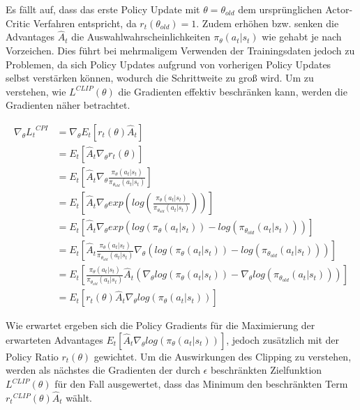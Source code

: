 Es fällt auf, dass das erste Policy Update mit $\theta = \theta_{old}$ dem ursprünglichen
Actor-Critic Verfahren entspricht, da $r_t(\theta_{old}) = 1$. Zudem erhöhen bzw. senken
die Advantages $\hat{A}_t$ die Auswahlwahrscheinlichkeiten $\pi_\theta(a_t | s_t)$
wie gehabt je nach Vorzeichen. Dies führt bei mehrmaligem Verwenden der Trainingsdaten
jedoch zu Problemen, da sich Policy Updates aufgrund von vorherigen Policy Updates
selbst verstärken können, wodurch die Schrittweite zu groß wird. Um zu verstehen,
wie $L^{CLIP}(\theta)$ die Gradienten effektiv beschränken kann, werden die Gradienten
näher betrachtet.

\begin{equation}
\begin{aligned}
\nabla_\theta {L_t}^{CPI}
&= \nabla_\theta E_t\left[r_t(\theta) \hat{A}_t\right]\\
&= E_t\left[\hat{A}_t \nabla_\theta r_t(\theta)\right]\\
&= E_t\left[\hat{A}_t \nabla_\theta
    \frac{\pi_\theta(a_t | s_t)}{\pi_{\theta_{old}}(a_t | s_t)}\right]\\
&= E_t\left[\hat{A}_t \nabla_\theta exp\left(log\left(\frac{\pi_\theta(a_t | s_t)}
    {\pi_{\theta_{old}}(a_t | s_t)}\right)\right)\right]\\
&= E_t\left[\hat{A}_t \nabla_\theta
    exp(log(\pi_\theta(a_t | s_t)) - log(\pi_{\theta_{old}}(a_t | s_t)))\right]
        \label{eq:ppograds}\\
&= E_t\left[\hat{A}_t \frac{\pi_\theta(a_t | s_t)}{\pi_{\theta_{old}}(a_t | s_t)}
    \nabla_\theta (log(\pi_\theta(a_t | s_t)) - log(\pi_{\theta_{old}}(a_t | s_t)))\right]\\
&= E_t\left[\frac{\pi_\theta(a_t | s_t)}{\pi_{\theta_{old}}(a_t | s_t)} \hat{A}_t
    (\nabla_\theta log(\pi_\theta(a_t | s_t))
        - \nabla_\theta log(\pi_{\theta_{old}}(a_t | s_t)))\right]\\
&= E_t\left[r_t(\theta) \hat{A}_t \nabla_\theta log(\pi_\theta(a_t | s_t))\right]
\end{aligned}
\end{equation}

Wie erwartet ergeben sich die Policy Gradients für die Maximierung der erwarteten
Advantages $E_t[\hat{A}_t\nabla_\theta log(\pi_\theta(a_t | s_t))]$, jedoch zusätzlich mit
der Policy Ratio $r_t(\theta)$ gewichtet. Um die Auswirkungen des Clipping zu verstehen,
werden als nächstes die Gradienten der durch $\epsilon$ beschränkten Zielfunktion
$L^{CLIP}(\theta)$ für den Fall ausgewertet, dass das Minimum den beschränkten Term
${r_t}^{CLIP}(\theta) \hat{A}_t$ wählt.

